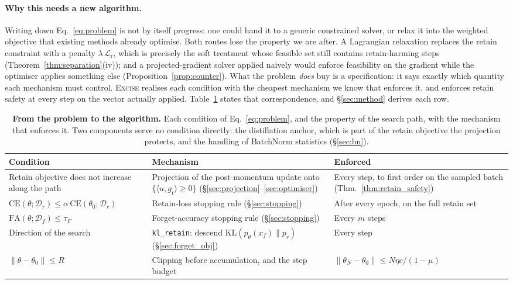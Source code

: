 \documentclass{article}
\newcommand{\ours}{\textsc{Excise}}
\newcommand{\klr}{\texttt{kl\_retain}}
\newcommand{\KL}{\mathrm{KL}}
\newcommand{\CE}{\mathrm{CE}}
\newcommand{\Df}{\mathcal{D}_f}
\newcommand{\Dr}{\mathcal{D}_r}
\newcommand{\gr}{g_{\mathrm{r}}}
\newcommand{\lossr}{\mathcal{L}_{\mathrm{r}}}
\newcommand{\rev}[1]{{\color{revisedB}#1}}
\theoremstyle{remark}
\theoremstyle{plain}
\begin{document}
\paragraph{Why this needs a new algorithm.} Writing down
Eq.~\ref{eq:problem} is not by itself progress: one could hand it to a generic
constrained solver, or relax it into the weighted objective that existing
methods already optimise. Both routes lose the property we are after. A
Lagrangian relaxation replaces the retain constraint with a penalty
$\lambda\,\lossr$, which is precisely the soft treatment whose feasible set still
contains retain-harming steps (Theorem~\ref{thm:separation}(iv)); and a
projected-gradient solver applied naively would enforce feasibility on the
gradient while the optimiser applies something else
(Proposition~\ref{prop:counter}). What the problem \emph{does} buy is a
specification: it says exactly which quantity each mechanism must control.
\rev{\ours{} realises each condition with the cheapest mechanism we know that
enforces it, and enforces retain safety at every step on the vector actually
applied.} Table~\ref{tab:constraint_map} states that correspondence, and
\S\ref{sec:method} derives each row.

\begin{table}[t]
\centering
\caption{\rev{\textbf{From the problem to the algorithm.} Each condition of
Eq.~\ref{eq:problem}, and the property of the search path, with the mechanism
that enforces it. Two components serve no condition directly: the distillation
anchor, which is part of the retain objective the projection protects, and the
handling of BatchNorm statistics (\S\ref{sec:bn}).}}
\label{tab:constraint_map}
\color{revisedB}
\begin{tabular}{@{}p{}p{}p{}@{}}
\toprule
\textbf{Condition} & \textbf{Mechanism} & \textbf{Enforced} \\
\midrule
Retain objective does not increase along the path &
Projection of the post-momentum update onto $\{\langle u,\gr\rangle \ge 0\}$ (\S\ref{sec:projection}--\ref{sec:optimiser}) &
Every step, to first order on the sampled batch (Thm.~\ref{thm:retain_safety}) \\
\addlinespace
$\CE(\theta;\Dr) \le \alpha\,\CE(\theta_0;\Dr)$ &
Retain-loss stopping rule (\S\ref{sec:stopping}) &
After every epoch, on the full retain set \\
\addlinespace
$\mathrm{FA}(\theta;\Df) \le \tau_F$ &
Forget-accuracy stopping rule (\S\ref{sec:stopping}) &
Every $m$ steps \\
\addlinespace
Direction of the search &
\klr{}: descend $\KL(p_\theta(x_f)\|p_r)$ (\S\ref{sec:forget_obj}) &
Every step \\
\addlinespace
$\|\theta - \theta_0\| \le R$ &
Clipping before accumulation, and the step budget &
$\|\theta_N - \theta_0\| \le N\eta c/(1-\mu)$ \\
\bottomrule
\end{tabular}
\end{table}
\end{document}
